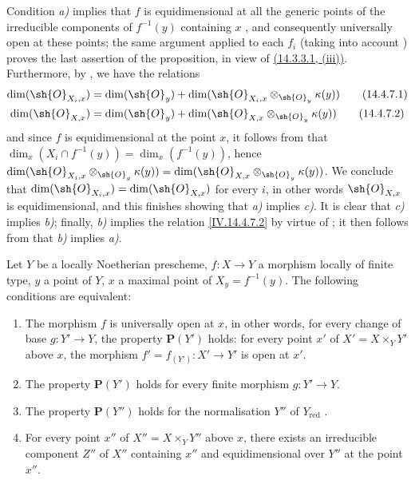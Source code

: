 Condition \emph{a)} implies that $f$ is equidimensional at all the generic points of the irreducible components of $f^{-1}(y)$ containing $x$ , and consequently  universally open at these points; the same argument applied to each $f_i$ (taking into account ) proves the last assertion of the proposition, in view of {\hyperlink{ega4.c04.subsec.14-3-3-1}{(14.3.3.1, (iii))}}.
Furthermore, by , we have the relations
\begin{align}
  \dim(\sh{O}_{X_i,x}) &= \dim(\sh{O}_y) + \dim(\sh{O}_{X_i,x}\otimes_{\sh{O}_y}\kappa(y))
  \tag{14.4.7.1}\label{IV.14.4.7.1}\\
  \dim(\sh{O}_{X,x}) &= \dim(\sh{O}_y) + \dim(\sh{O}_{X,x}\otimes_{\sh{O}_y}\kappa(y))
  \tag{14.4.7.2}\label{IV.14.4.7.2}
\end{align}
and since $f$ is equidimensional at the point $x$, it follows from  that $\dim_x(X_i\cap f^{-1}(y))=\dim_x(f^{-1}(y))$, hence  $\dim(\sh{O}_{X_i,x}\otimes_{\sh{O}_y}\kappa(y))=\dim(\sh{O}_{X,x}\otimes_{\sh{O}_y}\kappa(y))$.
We conclude that $\dim(\sh{O}_{X_i,x})=\dim(\sh{O}_{X,x})$ for every $i$, in other words $\sh{O}_{X,x}$ is equidimensional, and this finishes showing that \emph{a)} implies \emph{c)}.
It is clear that \emph{c)} implies \emph{b)}; finally, \emph{b)} implies the relation \eqref{IV.14.4.7.2} by virtue of ; it then follows from  that \emph{b)} implies \emph{a)}.

\begin{proposition}[14.4.8]
\label{IV.14.4.8}
Let $Y$ be a locally Noetherian prescheme, $f:X\to Y$ a morphism locally of finite type, $y$ a point of $Y$, $x$ a maximal point of $X_y=f^{-1}(y)$.
The following conditions are equivalent:
\begin{enumerate}[label=\emph{\alph*)}]
  \item The morphism $f$ is universally open at $x$, in other words, for every change of base $g:Y'\to Y$, the property $\mathbf{P}(Y')$ holds: for every point $x'$ of $X'=X\times_Y Y'$ above $x$, the morphism $f'=f_{(Y')}:X'\to Y'$ is open at $x'$.
  \item[\emph{a$'$)}] The property $\mathbf{P}(Y')$ holds for every finite morphism $g:Y'\to Y$.
  \item[\emph{a$''$)}] The property $\mathbf{P}(Y'')$ holds for the normalisation $Y''$ of $Y_{\mathrm{red}}$ .
  \item For every point $x''$ of $X''=X\times_Y Y''$ above $x$, there exists an irreducible component $Z''$ of $X''$ containing $x''$ and equidimensional over $Y''$ at the point $x''$.
\end{enumerate}
\end{proposition}

